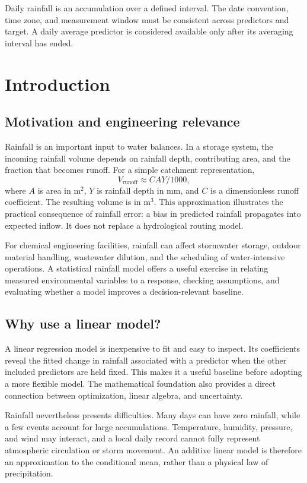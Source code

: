 \documentclass[11pt,a4paper]{article}
\newcommand{\sectionpage}[1]{\clearpage\section{#1}}
\begin{document}
Daily rainfall is an accumulation over a defined interval. The date convention, time zone, and measurement window must be consistent across predictors and target. A daily average predictor is considered available only after its averaging interval has ended.

\sectionpage{Introduction}
\subsection{Motivation and engineering relevance}
Rainfall is an important input to water balances. In a storage system, the incoming rainfall volume depends on rainfall depth, contributing area, and the fraction that becomes runoff. For a simple catchment representation,
\begin{equation}
V_{\mathrm{runoff}}\approx C A Y/1000,
\end{equation}
where $A$ is area in m$^2$, $Y$ is rainfall depth in mm, and $C$ is a dimensionless runoff coefficient. The resulting volume is in m$^3$. This approximation illustrates the practical consequence of rainfall error: a bias in predicted rainfall propagates into expected inflow. It does not replace a hydrological routing model.

For chemical engineering facilities, rainfall can affect stormwater storage, outdoor material handling, wastewater dilution, and the scheduling of water-intensive operations. A statistical rainfall model offers a useful exercise in relating measured environmental variables to a response, checking assumptions, and evaluating whether a model improves a decision-relevant baseline.

\subsection{Why use a linear model?}
A linear regression model is inexpensive to fit and easy to inspect. Its coefficients reveal the fitted change in rainfall associated with a predictor when the other included predictors are held fixed. This makes it a useful baseline before adopting a more flexible model. The mathematical foundation also provides a direct connection between optimization, linear algebra, and uncertainty.

Rainfall nevertheless presents difficulties. Many days can have zero rainfall, while a few events account for large accumulations. Temperature, humidity, pressure, and wind may interact, and a local daily record cannot fully represent atmospheric circulation or storm movement. An additive linear model is therefore an approximation to the conditional mean, rather than a physical law of precipitation.
\end{document}
